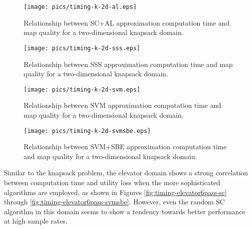 \begin{figure}
\begin{center}
\texttt{[image: pics/timing-k-2d-al.eps]}
\caption{Relationship between SC+AL approximation computation time and map quality for a two-dimensional knapsack domain.}
\label{fig:timing-k-2d-al}
\end{center}
\end{figure}

\begin{figure}
\begin{center}
\texttt{[image: pics/timing-k-2d-sss.eps]}
\caption{Relationship between SSS approximation computation time and map quality for a two-dimensional knapsack domain.}
\label{fig:timing-k-2d-sss}
\end{center}
\end{figure}


\begin{figure}
\begin{center}
\texttt{[image: pics/timing-k-2d-svm.eps]}
\caption{Relationship between SVM approximation computation time and map quality for a two-dimensional knapsack domain.}
\label{fig:timing-k-2d-svm}
\end{center}
\end{figure}

\begin{figure}
\begin{center}
\texttt{[image: pics/timing-k-2d-svmsbe.eps]}
\caption{Relationship between SVM+SBE approximation computation time and map quality for a two-dimensional knapsack domain.}
\label{fig:timing-k-2d-svmsbe}
\end{center}
\end{figure}

Similar to the knapsack problem,  the elevator domain shows a strong correlation between computation time and utility loss when the more sophisticated algorithms are employed, as shown in Figures \ref{fig:timing-elevator6pass-sc} through \ref{fig:timing-elevator6pass-svmsbe}.  However, even the random SC algorithm in this domain seems to show a tendency towards better performance at high sample rates.












